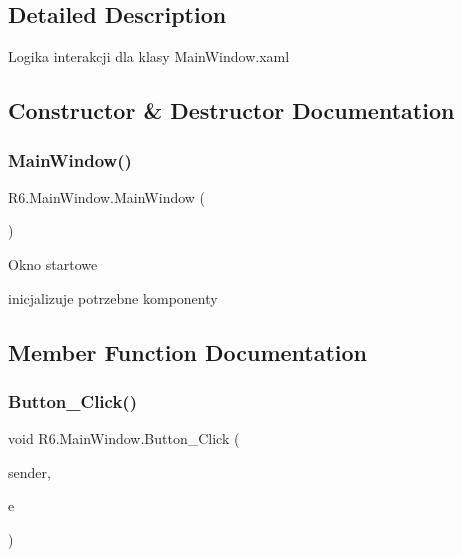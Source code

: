 \subsection{Detailed Description}
Logika interakcji dla klasy Main\+Window.\+xaml 



\subsection{Constructor \& Destructor Documentation}
\mbox{\label{class_r6_1_1_main_window_a5328e43ff39764267c22525652530585}} 
\subsubsection{\texorpdfstring{MainWindow()}{MainWindow()}}
{\footnotesize\ttfamily R6.\+Main\+Window.\+Main\+Window (\begin{DoxyParamCaption}{ }\end{DoxyParamCaption})}



Okno startowe 

inicjalizuje potrzebne komponenty 

\subsection{Member Function Documentation}
\mbox{\label{class_r6_1_1_main_window_af3ca3e5f108b9ec9cbe187df6d1d3e05}} 
\subsubsection{\texorpdfstring{Button\_Click()}{Button\_Click()}}
{\footnotesize\ttfamily void R6.\+Main\+Window.\+Button\+\_\+\+Click (\begin{DoxyParamCaption}\item[{object}]{sender,  }\item[{Routed\+Event\+Args}]{e }\end{DoxyParamCaption})\hspace{0.3cm}{\ttfamily [private]}}



